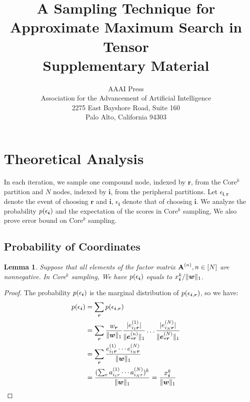 \documentclass[letterpaper]{article}
\title{A Sampling Technique for Approximate Maximum Search in Tensor\\Supplementary Material}
\author{AAAI Press\\
Association for the Advancement of Artificial Intelligence\\
2275 East Bayshore Road, Suite 160\\
Palo Alto, California 94303\\
}
\newcommand{\Sca}[3]{{#1}^{(#2)}_{i_#2#3}}%
\newcommand{\anr}[2]{\Sca{a}{#1}{#2}}
\newcommand{\V}[1]{{\boldsymbol{{\MakeLowercase{#1}}}}}
\newcommand{\ColVec}[3]{\V{#1}^{(#2)}_{#3}}
\newcommand{\M}[1]{{\textbf{{\MakeUppercase{#1}}}}}
\newcommand{\norm}[2]{\|#1\|_{#2}}
\newtheorem{lemma}{Lemma}
\begin{document}
\maketitle
\section{Theoretical Analysis}

In each iteration, 
we sample one compound node, indexed by $\boldsymbol{r}$, 
from the Core$^k$ partition and $N$ nodes, 
indexed by $\boldsymbol{i}$, from the peripheral partitions. 
Let $\epsilon_{\boldsymbol{i},\boldsymbol{r}}$ 
denote the event of choosing $\boldsymbol{r}$ 
and $\boldsymbol{i}$, $\epsilon_{\boldsymbol{i}}$ denote that of choosing $\boldsymbol{i}$.
We analyze the probability $p(\epsilon_{\V{i}})$ and the expectation of the scores in Core$^k$ sampling,
We also prove error bound on Core$^k$ sampling.

\subsection{Probability of Coordinates}
\begin{lemma}\label{lem:Probability}
    Suppose that all elements of the factor matrix $\M{A}^{(n)}, n\in[N]$ are nonnegative. 
    In Core$^k$ sampling, We have $p(\epsilon_{\V{i}})$ equals to $x^k_{\V{i}}/\norm{\V{w}}{1}$.
\end{lemma}
\begin{proof}
The probability $p(\epsilon_{\V{i}})$ is the marginal distribution of $p(\epsilon_{\V{i},\V{r}})$,
so we have:
\begin{align*}
p(\epsilon_{\V{i}})
& = \sum_{\V{r}} p(\epsilon_{\V{i},\V{r}}) \\
& = \sum_{\V{r}} \frac{w_{\V{r}}}{\norm{\V{W}}{1}}
    \frac{|\Sca{e}{1}{\V{r}}|}{\norm{\ColVec{e}{n}{*\V{r}}}{1}}\ldots\frac{|\Sca{e}{N}{\V{r}}|}{\norm{\ColVec{e}{N}{*\V{r}}}{1}}\\
& = \sum_{\V{r}} \frac{\Sca{e}{1}{\V{r}}\cdots\Sca{e}{N}{\V{r}}}{\norm{\V{W}}{1}}\\
& = \frac{(\sum_{r}\anr{1}{r}\cdots\anr{N}{r})^k}{\norm{\V{W}}{1}}
  = \frac{x^k_{\V{i}}}{\norm{\V{w}}{1}}
\end{align*}
\end{proof}
\end{document}
